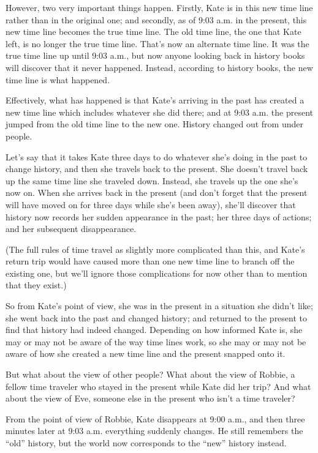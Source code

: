 \begin{multicols*}{2}
However, two very important things happen. Firstly, Kate is in this new time line rather than in the original one; and secondly, as of 9:03 a.m. in the present, this new time line becomes the true time line. The old time line, the one that Kate left, is no longer the true time line. That’s now an alternate time line. It was the true time line up until 9:03 a.m., but now anyone looking back in history books will discover that it never happened. Instead, according to history books, the new time line is what happened. 

Effectively, what has happened is that Kate’s arriving in the past has created a new time line which includes whatever she did there; and at 9:03 a.m. the present jumped from the old time line to the new one. History changed out from under people.

Let’s say that it takes Kate three days to do whatever she’s doing in the past to change history, and then she travels back to the present. She doesn’t travel back up the same time line she traveled down. Instead, she travels up the one she’s now on. When she arrives back in the present (and don’t forget that the present will have moved on for three days while she’s been away), she’ll discover that history now records her sudden appearance in the past; her three days of actions; and her subsequent disappearance.

(The full rules of time travel as slightly more complicated than this, and Kate’s return trip would have caused more than one new time line to branch off the existing one, but we’ll ignore those complications for now other than to mention that they exist.)

So from Kate’s point of view, she was in the present in a situation she didn’t like; she went back into the past and changed history; and returned to the present to find that history had indeed changed. Depending on how informed Kate is, she may or may not be aware of the way time lines work, so she may or may not be aware of how she created a new time line and the present snapped onto it.

But what about the view of other people? What about the view of Robbie, a fellow time traveler who stayed in the present while Kate did her trip? And what about the view of Eve, someone else in the present who isn’t a time traveler?

From the point of view of Robbie, Kate disappears at 9:00 a.m., and then three minutes later at 9:03 a.m. everything suddenly changes. He still remembers the “old” history, but the world now corresponds to the “new” history instead.


\end{multicols*}
